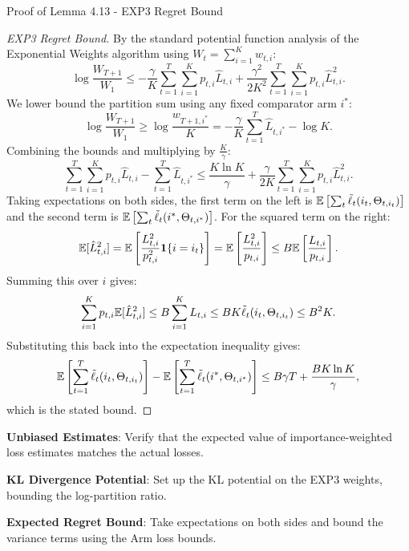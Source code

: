 \begin{sourceblock}{Proof of Lemma 4.13 - EXP3 Regret Bound}
\begin{proof}[EXP3 Regret Bound]
By the standard potential function analysis of the Exponential Weights algorithm using $W_t = \sum_{i=1}^K w_{t,i}$:
\begin{equation}
    \log\frac{W_{T+1}}{W_1} \le - \frac{\gamma}{K}\sum_{t=1}^T \sum_{i=1}^K p_{t,i} \hat{L}_{t,i} + \frac{\gamma^2}{2 K^2}\sum_{t=1}^T \sum_{i=1}^K p_{t,i} \hat{L}_{t,i}^2.
\end{equation}
We lower bound the partition sum using any fixed comparator arm $i^*$:
\begin{equation}
    \log\frac{W_{T+1}}{W_1} \ge \log \frac{w_{T+1, i^*}}{K} = - \frac{\gamma}{K}\sum_{t=1}^T \hat{L}_{t, i^*} - \log K.
\end{equation}
Combining the bounds and multiplying by $\frac{K}{\gamma}$:
\begin{equation}
    \sum_{t=1}^T \sum_{i=1}^K p_{t,i} \hat{L}_{t,i} - \sum_{t=1}^T \hat{L}_{t, i^*} \le \frac{K \ln K}{\gamma} + \frac{\gamma}{2 K}\sum_{t=1}^T \sum_{i=1}^K p_{t,i} \hat{L}_{t,i}^2.
\end{equation}
Taking expectations on both sides, the first term on the left is $\mathbb{E}\left[\sum_t \tilde{\ell}_t(i_t, \Theta_{t, i_t})\right]$ and the second term is $\mathbb{E}\left[\sum_t \tilde{\ell}_t(i^*, \Theta_{t, i^*})\right]$. For the squared term on the right:
\begin{equation}
    \mathbb{E}[\hat{L}_{t,i}^2] = \mathbb{E}\left[ \frac{L_{t,i}^2}{p_{t,i}^2} \mathbf{1}\{i = i_t\} \right] = \mathbb{E}\left[ \frac{L_{t,i}^2}{p_{t,i}} \right] \le B \mathbb{E}\left[ \frac{L_{t,i}}{p_{t,i}} \right].
\end{equation}
Summing this over $i$ gives:
\begin{equation}
    \sum_{i=1}^K p_{t,i} \mathbb{E}[\hat{L}_{t,i}^2] \le B \sum_{i=1}^K L_{t,i} \le B K \tilde{\ell}_t(i_t, \Theta_{t, i_t}) \le B^2 K.
\end{equation}
Substituting this back into the expectation inequality gives:
\begin{equation}
    \mathbb{E}\left[ \sum_{t=1}^T \tilde{\ell}_t(i_t, \Theta_{t, i_t}) \right] - \mathbb{E}\left[ \sum_{t=1}^T \tilde{\ell}_t(i^*, \Theta_{t, i^*}) \right] \le B \gamma T + \frac{B K \ln K}{\gamma},
\end{equation}
which is the stated bound.
\end{proof}
\end{sourceblock}

\begin{guideblock}
\item \textbf{Unbiased Estimates}: Verify that the expected value of importance-weighted loss estimates matches the actual losses.
\item \textbf{KL Divergence Potential}: Set up the KL potential on the EXP3 weights, bounding the log-partition ratio.
\item \textbf{Expected Regret Bound}: Take expectations on both sides and bound the variance terms using the Arm loss bounds.
\end{guideblock}


